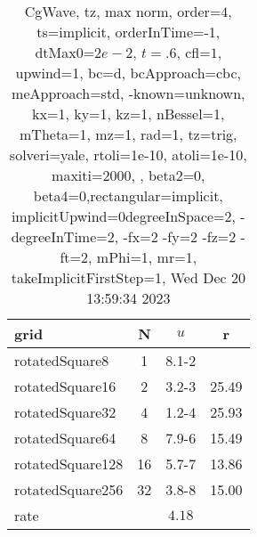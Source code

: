 \begin{table}[H]\tableFont %
\begin{center}
\begin{tabular}{|l|c|c|c|} \hline 
grid  & N &  $ u $ & r \\ \hline 
      rotatedSquare8 &     1 & \num{8.1}{-2} &        \\ \hline
     rotatedSquare16 &     2 & \num{3.2}{-3} & 25.49  \\ \hline
     rotatedSquare32 &     4 & \num{1.2}{-4} & 25.93  \\ \hline
     rotatedSquare64 &     8 & \num{7.9}{-6} & 15.49  \\ \hline
    rotatedSquare128 &    16 & \num{5.7}{-7} & 13.86  \\ \hline
    rotatedSquare256 &    32 & \num{3.8}{-8} & 15.00  \\ \hline
    rate             &       &  $4.18$       &       \\ \hline
\end{tabular}
\caption{CgWave, tz, max norm, order=$4$, ts=implicit, orderInTime=-1, dtMax0=$2e-2$, $t=.6$, cfl=$1$, upwind=1, bc=d, bcApproach=cbc, meApproach=std, -known=unknown, kx=1, ky=1, kz=1, nBessel=1, mTheta=1, mz=1, rad=1, tz=trig, solveri=yale, rtoli=1e-10, atoli=1e-10, maxiti=2000, , beta2=0, beta4=0,rectangular=implicit, implicitUpwind=0degreeInSpace=2, -degreeInTime=2, -fx=2 -fy=2 -fz=2 -ft=2, mPhi=1, mr=1, takeImplicitFirstStep=1, Wed Dec 20 13:59:34 2023}\label{table:tzOrder4max}
\end{center}
\end{table}
